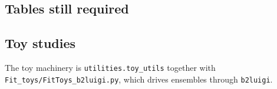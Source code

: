 \subsection{Tables still required}
\label{app:fit:todo}


\subsection{Toy studies}
\label{app:fit:toys}

The toy machinery is \texttt{utilities.toy\_utils} together with
\texttt{Fit\_toys/FitToys\_b2luigi.py}, which drives ensembles through
\texttt{b2luigi}.
